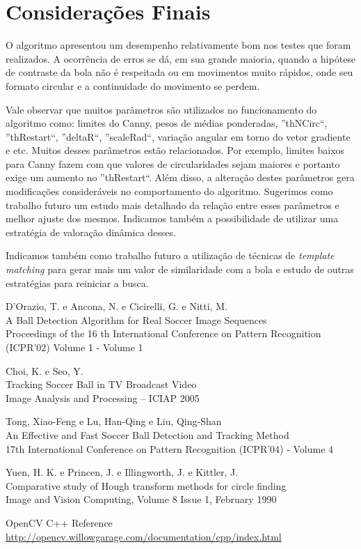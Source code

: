 \documentclass[11pt,a4paper]{article}
\begin{document}
\section{Considerações Finais}
 O algoritmo apresentou um desempenho relativamente bom nos testes que foram realizados. A ocorrência de erros se dá, em sua grande maioria, quando a hipótese de contraste da bola não é respeitada ou em movimentos muito rápidos, onde seu formato circular e a continuidade do movimento se perdem.

 Vale observar que muitos parâmetros são utilizados no funcionamento do algoritmo como: limites do Canny, pesos de médias ponderadas, ''thNCirc``, ''thRestart``, ''deltaR``, ''scaleRad``, variação angular em torno do vetor gradiente e etc. Muitos desses parâmetros estão relacionados. Por exemplo, limites baixos para Canny fazem com que valores de circularidades sejam maiores e portanto exige um aumento no ''thRestart``. Além disso, a alteração destes parâmetros gera modificações consideráveis no comportamento do algoritmo. Sugerimos como trabalho futuro um estudo mais detalhado da relação entre esses parâmetros e melhor ajuste dos mesmos. Indicamos também a possibilidade de utilizar uma estratégia de valoração dinâmica desses.

 Indicamos também como trabalho futuro a utilização de técnicas de \textit{template matching} para gerar mais um valor de similaridade com a bola e estudo de outras estratégias para reiniciar a busca.

\begin{thebibliography}{99}

 D'Orazio, T. e Ancona, N. e Cicirelli, G. e Nitti, M.\\
 A Ball Detection Algorithm for Real Soccer Image Sequences\\
 Proceedings of the 16 th International Conference on Pattern Recognition (ICPR'02) Volume 1 - Volume 1

 Choi, K. e Seo, Y.\\
 Tracking Soccer Ball in TV Broadcast Video\\
 Image Analysis and Processing – ICIAP 2005

 Tong, Xiao-Feng e Lu, Han-Qing e Liu, Qing-Shan\\
 An Effective and Fast Soccer Ball Detection and Tracking Method\\
 17th International Conference on Pattern Recognition (ICPR'04) - Volume 4

 Yuen, H. K. e Princen, J. e Illingworth, J. e Kittler, J.\\
 Comparative study of Hough transform methods for circle finding\\
 Image and Vision Computing, Volume 8 Issue 1, February 1990 

 OpenCV C++ Reference\\
 \url{http://opencv.willowgarage.com/documentation/cpp/index.html}

\end{thebibliography}
\end{document}
